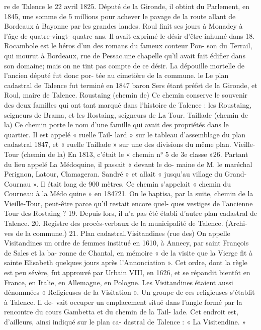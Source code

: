 \documentclass[a4paper,11pt]{book}
\begin{document}
re de Talence le 22 avril 1825. Député de la Gironde, il
obtint du Parlement, en 1845, une somme de 5 millions
pour achever le pavage de la route allant de Bordeaux à
Bayonne par les grandes landes.
Roul finit ses jours à Monadey à l'âge de quatre-vingt-
quatre ans. Il avait exprimé le désir d'être inhumé dans
18. Rocambole est le héros d'un des romans du fameux conteur Pon-
son du Terrail, qui mourut à Bordeaux, rue de Pessac.une chapelle qu'il avait fait édifier dans son domaine;
mais on ne tint pas compte de ce désir.
La dépouille mortelle de l'ancien député fut donc por-
tée au cimetière de la commune.
le
Le plan cadastral de Talence fut terminé en 1847
baron Sers étant préfet de la Gironde, et Roul, maire de
Talence.
Roustaing (chemin de)
Ce chemin conserve le souvenir des deux familles qui
ont tant marqué dans l'histoire de Talence : les Roustaing,
seigneurs de Brama, et les Rostaing, seigneurs de La
Tour.
Taillade (chemin de la)
Ce chemin porte le nom d'une famille qui avait des
propriétés dans le quartier. Il est appelé « ruelle Tail-
lard » sur le tableau d'assemblage du plan cadastral 1847,
et « ruelle Taillade » sur une des divisions du même plan.
Vieille-Tour (chemin de la)
En 1813, c'était le « chemin n° 5 de 3e classe »26. Partant
du lieu appelé La Médoquine, il passait « devant le do-
maine de M. le maréchal Perignon, Latour, Clamageran.
Sandré » et allait « jusqu'au village du Grand-Cournau ».
Il était long de 900 mètres.
Ce chemin s'appelait « chemin du Courneau à la Médo
quine » en 184721. On le baptisa, par la suite, chemin de
la Vieille-Tour, peut-être parce qu'il restait encore quel-
ques vestiges de l'ancienne Tour des Rostaing ?
19. Depuis lors, il n'a pas été établi d'autre plan cadastral de Talence.
20. Registre des procès-verbaux de la municipalité de Talence. (Archi-
ves de la commune.)
21. Plan cadastral.Visitandines (rue des)
On appelle Visitandines un ordre de femmes institué
en 1610, à Annecy, par saint François de Sales et la ba-
ronne de Chantal, en mémoire « de la visite que la Vierge
fit à sainte Elisabeth quelques jours après l'Annonciation ».
Cet ordre, dont la règle est peu sévère, fut approuvé par
Urbain VIII, en 1626, et se répandit bientôt en France, en
Italie, en Allemagne, en Pologne.
Les Visitandines étaient aussi dénommées « Religieuses
de la Visitation ».
Un groupe de ces religieuses s'établit à Talence. Il de-
vait occuper un emplacement situé dans l'angle formé par
la rencontre du cours Gambetta et du chemin de la Tail-
lade. Cet endroit est, d'ailleurs, ainsi indiqué sur le plan ca-
dastral de Talence : « La Visitendine. »
\end{document}
